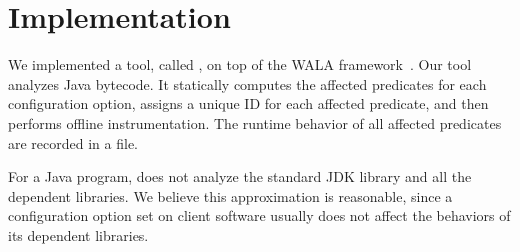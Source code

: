 \section{Implementation}
\label{sec:implementation}

We implemented a tool, called \ourtool, on top of the WALA
framework~\cite{wala}. Our tool analyzes Java bytecode.
It statically computes the affected predicates
for each configuration option, assigns a unique
ID for each affected predicate, and then performs offline instrumentation.
The runtime behavior of all affected predicates are recorded
in a file. 



For a Java program, \ourtool does not analyze the standard JDK
library and all the dependent libraries. We believe this approximation
is reasonable, since a configuration option set on client software
usually does not affect the behaviors of its dependent libraries.


